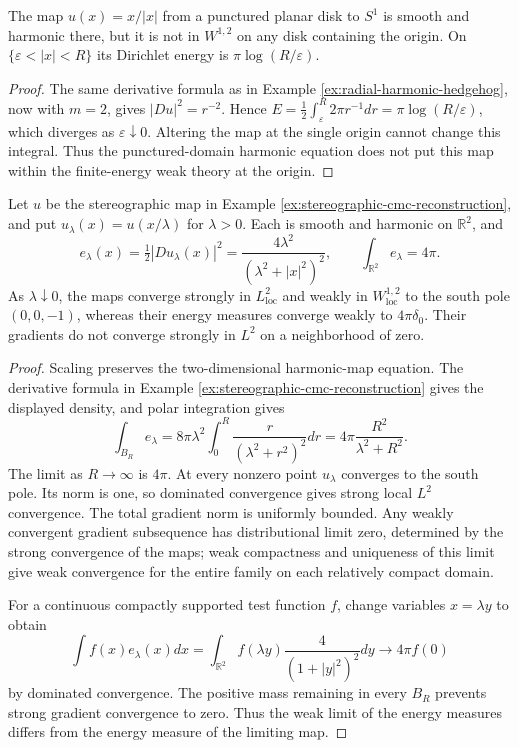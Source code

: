 \begin{example}\label{ex:planar-vortex-infinite-energy}
The map $u(x)=x/|x|$ from a punctured planar disk to $S^1$ is smooth and harmonic there, but it is not in $W^{1,2}$ on any disk containing the origin. On $\{\varepsilon<|x|<R\}$ its Dirichlet energy is $\pi\log(R/\varepsilon)$.
\end{example}
\begin{proof}
The same derivative formula as in Example \ref{ex:radial-harmonic-hedgehog}, now with $m=2$, gives $|Du|^2=r^{-2}$. Hence $E=\frac12\int_\varepsilon^R2\pi r^{-1}dr=\pi\log(R/\varepsilon)$, which diverges as $\varepsilon\downarrow0$. Altering the map at the single origin cannot change this integral. Thus the punctured-domain harmonic equation does not put this map within the finite-energy weak theory at the origin.
\end{proof}

\begin{example}\label{ex:stereographic-energy-concentration}
Let $u$ be the stereographic map in Example \ref{ex:stereographic-cmc-reconstruction}, and put $u_\lambda(x)=u(x/\lambda)$ for $\lambda>0$. Each is smooth and harmonic on $\mathbb R^2$, and
\[
 e_\lambda(x)=\tfrac12|Du_\lambda(x)|^2=\frac{4\lambda^2}{(\lambda^2+|x|^2)^2},\qquad
 \int_{\mathbb R^2}e_\lambda=4\pi.
\]
As $\lambda\downarrow0$, the maps converge strongly in $L^2_{\mathrm{loc}}$ and weakly in $W^{1,2}_{\mathrm{loc}}$ to the south pole $(0,0,-1)$, whereas their energy measures converge weakly to $4\pi\delta_0$. Their gradients do not converge strongly in $L^2$ on a neighborhood of zero.
\end{example}
\begin{proof}
Scaling preserves the two-dimensional harmonic-map equation. The derivative formula in Example \ref{ex:stereographic-cmc-reconstruction} gives the displayed density, and polar integration gives
\[
 \int_{B_R}e_\lambda=8\pi\lambda^2\int_0^R\frac{r}{(\lambda^2+r^2)^2}dr
 =4\pi\frac{R^2}{\lambda^2+R^2}.
\]
The limit as $R\to\infty$ is $4\pi$. At every nonzero point $u_\lambda$ converges to the south pole. Its norm is one, so dominated convergence gives strong local $L^2$ convergence. The total gradient norm is uniformly bounded. Any weakly convergent gradient subsequence has distributional limit zero, determined by the strong convergence of the maps; weak compactness and uniqueness of this limit give weak convergence for the entire family on each relatively compact domain.

For a continuous compactly supported test function $f$, change variables $x=\lambda y$ to obtain
\[
 \int f(x)e_\lambda(x)dx=\int_{\mathbb R^2}f(\lambda y)\frac4{(1+|y|^2)^2}dy\longrightarrow4\pi f(0)
\]
by dominated convergence. The positive mass remaining in every $B_R$ prevents strong gradient convergence to zero. Thus the weak limit of the energy measures differs from the energy measure of the limiting map.
\end{proof}

